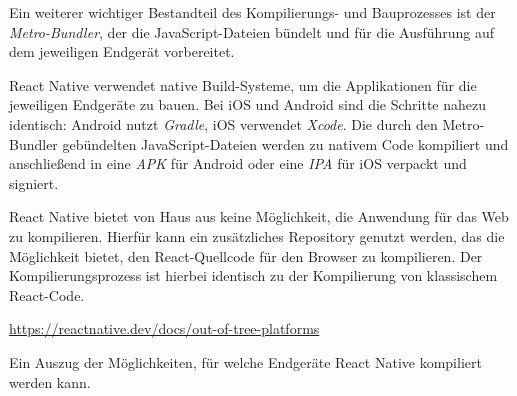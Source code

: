 \vspace{0.5cm}

Ein weiterer wichtiger Bestandteil des Kompilierungs- und Bauprozesses ist der \textit{Metro-Bundler}, der die JavaScript-Dateien bündelt und für die Ausführung auf dem jeweiligen Endgerät vorbereitet.

\vspace{0.5cm}

React Native verwendet native Build-Systeme, um die Applikationen für die jeweiligen Endgeräte zu bauen. Bei iOS und Android sind die Schritte nahezu identisch: Android nutzt \textit{Gradle}, iOS verwendet \textit{Xcode}. Die durch den Metro-Bundler gebündelten JavaScript-Dateien werden zu nativem Code kompiliert und anschließend in eine \textit{APK} für Android oder eine \textit{IPA} für iOS verpackt und signiert.

\vspace{0.5cm}

React Native bietet von Haus aus keine Möglichkeit, die Anwendung für das Web zu kompilieren. Hierfür kann ein zusätzliches Repository genutzt werden, das die Möglichkeit bietet, den React-Quellcode für den Browser zu kompilieren. Der Kompilierungsprozess ist hierbei identisch zu der Kompilierung von klassischem React-Code.

\vspace{0.5cm}

\begin{center}
    \url{https://reactnative.dev/docs/out-of-tree-platforms}
\end{center}

Ein Auszug der Möglichkeiten, für welche Endgeräte React Native kompiliert werden kann.